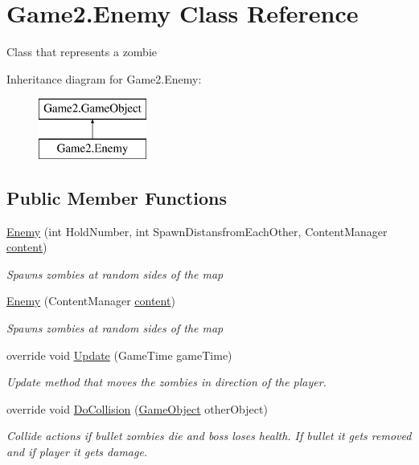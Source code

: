 \hypertarget{class_game2_1_1_enemy}{}\section{Game2.\+Enemy Class Reference}
\label{class_game2_1_1_enemy}


Class that represents a zombie  


Inheritance diagram for Game2.\+Enemy\+:\begin{figure}[H]
\begin{center}
\leavevmode
\includegraphics[height=2.000000cm]{class_game2_1_1_enemy}
\end{center}
\end{figure}
\subsection*{Public Member Functions}
\begin{DoxyCompactItemize}
\item 
\mbox{\hyperlink{class_game2_1_1_enemy_ac96eace4797abdd8d99c0e67348f1f7d}{Enemy}} (int Hold\+Number, int Spawn\+Distansfrom\+Each\+Other, Content\+Manager \mbox{\hyperlink{class_game2_1_1_game_object_ae8a9e4574e531d2fbb2168a155f2ac53}{content}})
\begin{DoxyCompactList}\small\item\em Spawns zombies at random sides of the map \end{DoxyCompactList}\item 
\mbox{\hyperlink{class_game2_1_1_enemy_abb82db1812e2fa2b074f0bc0c53471d1}{Enemy}} (Content\+Manager \mbox{\hyperlink{class_game2_1_1_game_object_ae8a9e4574e531d2fbb2168a155f2ac53}{content}})
\begin{DoxyCompactList}\small\item\em Spawns zombies at random sides of the map \end{DoxyCompactList}\item 
override void \mbox{\hyperlink{class_game2_1_1_enemy_a5e3fdb40fb9884bda064eb671896d264}{Update}} (Game\+Time game\+Time)
\begin{DoxyCompactList}\small\item\em Update method that moves the zombies in direction of the player. \end{DoxyCompactList}\item 
override void \mbox{\hyperlink{class_game2_1_1_enemy_a574b0e99f86ce3a5e126484518020dac}{Do\+Collision}} (\mbox{\hyperlink{class_game2_1_1_game_object}{Game\+Object}} other\+Object)
\begin{DoxyCompactList}\small\item\em Collide actions if bullet zombies die and boss loses health. If bullet it gets removed and if player it gets damage. \end{DoxyCompactList}\end{DoxyCompactItemize}
